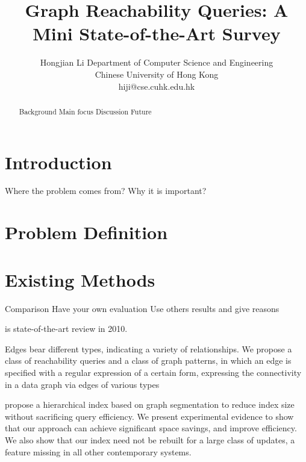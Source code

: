 \documentclass[12pt, conference, compsocconf]{../IEEEtran}
\begin{document}
\title{Graph Reachability Queries: A Mini State-of-the-Art Survey}
\author
{
\IEEEauthorblockN
{
Hongjian Li
\IEEEauthorblockA
{
Department of Computer Science and Engineering\\
Chinese University of Hong Kong\\
hiji@cse.cuhk.edu.hk
}
}
}
\maketitle

\begin{abstract}

Background
Main focus
Discussion
Future

\end{abstract}




\section{Introduction}

Where the problem comes from?
Why it is important?

\section{Problem Definition}



\section{Existing Methods}

Comparison
Have your own evaluation
Use others results and give reasons

\citep{1063} is state-of-the-art review in 2010.

\citep{1052} Edges bear different types, indicating a variety of relationships. We propose a class of reachability queries and a class of graph patterns, in which an edge is specified with a regular expression of a certain form, expressing the connectivity in a data graph via edges of various types

\citep{1053} propose a hierarchical index based on graph segmentation to reduce index size without sacrificing query efficiency. We present experimental evidence to show that our approach can achieve significant space savings, and improve efficiency. We also show that our index need not be rebuilt for a large class of updates, a feature missing in all other contemporary systems.
\end{document}
